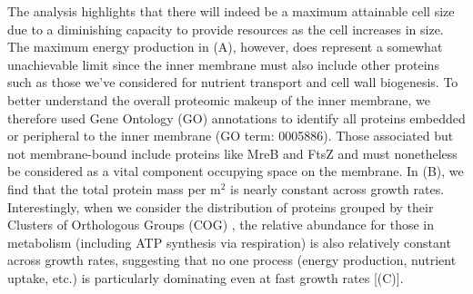The analysis highlights that there will indeed be a maximum attainable cell size
due to a diminishing capacity to provide resources as the cell increases in
size. The maximum energy production in (A), however, does
represent a somewhat unachievable limit since the inner membrane must also
include other proteins such as those we've considered for nutrient transport and cell
wall biogenesis. To better understand the overall proteomic makeup of the inner
membrane, we therefore used Gene Ontology (GO) annotations \citep{ashburner2000,
thegeneOntologyconsortium2018} to identify all proteins embedded or peripheral
to the inner membrane (GO term: 0005886). Those associated but not
membrane-bound include proteins like MreB and FtsZ and must nonetheless be
considered as a vital component occupying space on the membrane. In
(B), we find that the total protein mass per \textmu m$^2$
is nearly constant across growth rates. Interestingly, when we consider the
distribution of proteins grouped by their Clusters of Orthologous Groups (COG)
\citep{tatusov2000}, the relative abundance for those in metabolism (including
ATP synthesis via respiration) is also relatively constant across growth rates,
suggesting that no one process (energy production, nutrient uptake, etc.) is
particularly dominating even at fast growth rates [(C)].

